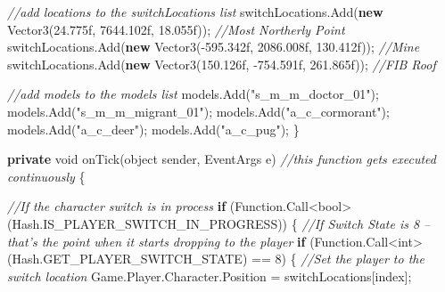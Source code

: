 \documentclass[
  openany]{book}
\newenvironment{Shaded}{\begin{snugshade}}{\end{snugshade}}
\newcommand{\CommentTok}[1]{\textcolor[rgb]{0.56,0.35,0.01}{\textit{#1}}}
\newcommand{\DataTypeTok}[1]{\textcolor[rgb]{0.13,0.29,0.53}{#1}}
\newcommand{\DecValTok}[1]{\textcolor[rgb]{0.00,0.00,0.81}{#1}}
\newcommand{\FloatTok}[1]{\textcolor[rgb]{0.00,0.00,0.81}{#1}}
\newcommand{\FunctionTok}[1]{\textcolor[rgb]{0.00,0.00,0.00}{#1}}
\newcommand{\KeywordTok}[1]{\textcolor[rgb]{0.13,0.29,0.53}{\textbf{#1}}}
\newcommand{\NormalTok}[1]{#1}
\newcommand{\StringTok}[1]{\textcolor[rgb]{0.31,0.60,0.02}{#1}}
\begin{document}
\begin{Shaded}
\begin{Highlighting}[]
        \CommentTok{//add locations to the switchLocations list}
\NormalTok{            switchLocations.}\FunctionTok{Add}\NormalTok{(}\KeywordTok{new} \FunctionTok{Vector3}\NormalTok{(}\FloatTok{24.775f}\NormalTok{, }\FloatTok{7644.102f}\NormalTok{, }\FloatTok{18.055f}\NormalTok{)); }\CommentTok{//Most Northerly Point}
\NormalTok{            switchLocations.}\FunctionTok{Add}\NormalTok{(}\KeywordTok{new} \FunctionTok{Vector3}\NormalTok{(-}\FloatTok{595.342f}\NormalTok{, }\FloatTok{2086.008f}\NormalTok{, }\FloatTok{130.412f}\NormalTok{)); }\CommentTok{//Mine}
\NormalTok{            switchLocations.}\FunctionTok{Add}\NormalTok{(}\KeywordTok{new} \FunctionTok{Vector3}\NormalTok{(}\FloatTok{150.126f}\NormalTok{, }\FloatTok{-754.591f}\NormalTok{, }\FloatTok{261.865f}\NormalTok{)); }\CommentTok{//FIB Roof }
    
        \CommentTok{//add models to the models list}
\NormalTok{            models.}\FunctionTok{Add}\NormalTok{(}\StringTok{"s_m_m_doctor_01"}\NormalTok{);}
\NormalTok{            models.}\FunctionTok{Add}\NormalTok{(}\StringTok{"s_m_m_migrant_01"}\NormalTok{);}
\NormalTok{            models.}\FunctionTok{Add}\NormalTok{(}\StringTok{"a_c_cormorant"}\NormalTok{);}
\NormalTok{            models.}\FunctionTok{Add}\NormalTok{(}\StringTok{"a_c_deer"}\NormalTok{);}
\NormalTok{            models.}\FunctionTok{Add}\NormalTok{(}\StringTok{"a_c_pug"}\NormalTok{);}
\NormalTok{        \}}

        \KeywordTok{private} \DataTypeTok{void} \FunctionTok{onTick}\NormalTok{(}\DataTypeTok{object}\NormalTok{ sender, EventArgs e) }\CommentTok{//this function gets executed continuously }
\NormalTok{        \{}
            
            \CommentTok{//If the character switch is in process}
            \KeywordTok{if}\NormalTok{ (Function.}\FunctionTok{Call}\NormalTok{<}\DataTypeTok{bool}\NormalTok{>(Hash.}\FunctionTok{IS_PLAYER_SWITCH_IN_PROGRESS}\NormalTok{))}
\NormalTok{            \{}
                \CommentTok{//If Switch State is 8 – that's the point when it starts dropping to the player }
                \KeywordTok{if}\NormalTok{ (Function.}\FunctionTok{Call}\NormalTok{<}\DataTypeTok{int}\NormalTok{>(Hash.}\FunctionTok{GET_PLAYER_SWITCH_STATE}\NormalTok{) == }\DecValTok{8}\NormalTok{)}
\NormalTok{                \{}
                    \CommentTok{//Set the player to the switch location}
\NormalTok{                    Game.}\FunctionTok{Player}\NormalTok{.}\FunctionTok{Character}\NormalTok{.}\FunctionTok{Position}\NormalTok{ = switchLocations[index];}


\end{Highlighting}
\end{Shaded}
\end{document}
